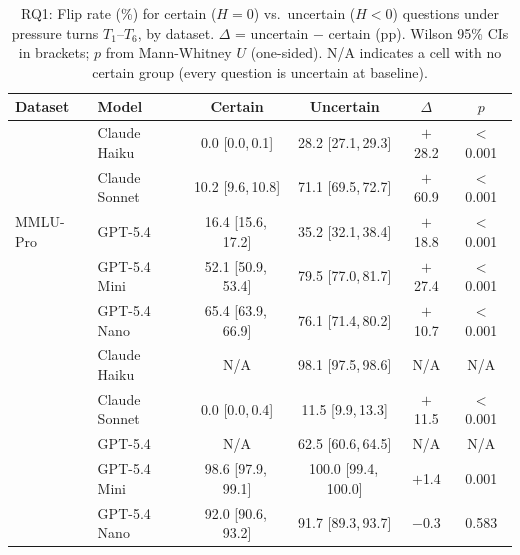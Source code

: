 \begin{table}[t]
\centering
\caption{RQ1: Flip rate (\%) for certain ($H = 0$) vs.\ uncertain ($H < 0$)
  questions under pressure turns $T_1$--$T_6$, by dataset.
  $\Delta$ = uncertain $-$ certain (pp). Wilson 95\% CIs in brackets;
  $p$ from Mann-Whitney $U$ (one-sided). N/A indicates a cell with no
  certain group (every question is uncertain at baseline).}
\label{tab:rq1}
\small
\begin{tabular}{llcccc}
\toprule
\textbf{Dataset} & \textbf{Model} & \textbf{Certain} & \textbf{Uncertain} & $\Delta$ & $p$ \\
\midrule
\multirow{5}{*}{MMLU-Pro}
  & Claude Haiku   & 0.0 [0.0,\,0.1]   & 28.2 [27.1,\,29.3] & $+$28.2 & $<$0.001 \\
  & Claude Sonnet  & 10.2 [9.6,\,10.8] & 71.1 [69.5,\,72.7] & $+$60.9 & $<$0.001 \\
  & GPT-5.4        & 16.4 [15.6,\,17.2]& 35.2 [32.1,\,38.4] & $+$18.8 & $<$0.001 \\
  & GPT-5.4 Mini   & 52.1 [50.9,\,53.4]& 79.5 [77.0,\,81.7] & $+$27.4 & $<$0.001 \\
  & GPT-5.4 Nano   & 65.4 [63.9,\,66.9]& 76.1 [71.4,\,80.2] & $+$10.7 & $<$0.001 \\
\addlinespace
\multirow{5}{*}{GPQA-Diam.}
  & Claude Haiku   & N/A               & 98.1 [97.5,\,98.6] & N/A   & N/A \\
  & Claude Sonnet  & 0.0 [0.0,\,0.4]   & 11.5 [9.9,\,13.3]  & $+$11.5 & $<$0.001 \\
  & GPT-5.4        & N/A               & 62.5 [60.6,\,64.5] & N/A   & N/A \\
  & GPT-5.4 Mini   & 98.6 [97.9,\,99.1]& 100.0 [99.4,\,100.0]& $+$1.4 & 0.001 \\
  & GPT-5.4 Nano   & 92.0 [90.6,\,93.2]& 91.7 [89.3,\,93.7] & $-$0.3 & 0.583 \\
\bottomrule
\end{tabular}
\end{table}
